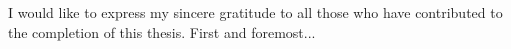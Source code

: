 I would like to express my sincere gratitude to all those who have contributed to the completion of this thesis. First and foremost...
